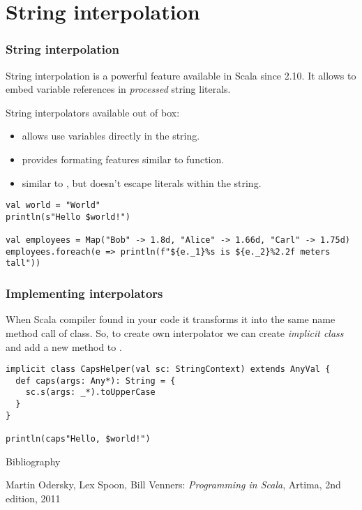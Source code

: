 \documentclass{beamer}
\begin{document}
\section{String interpolation}

\begin{frame}[fragile]
\frametitle{String interpolation}

String interpolation is a powerful feature available in Scala since 2.10.  It allows to embed variable
references in \emph{processed} string literals.

String interpolators available out of box:
\begin{itemize}
\item {} allows use variables directly in the string.
\item {} provides formating features similar to  function.
\item {} similar to , but doesn't escape literals within the string.
\end{itemize}

\begin{example}
\begin{lstlisting}
val world = "World"
println(s"Hello $world!")

val employees = Map("Bob" -> 1.8d, "Alice" -> 1.66d, "Carl" -> 1.75d)
employees.foreach(e => println(f"${e._1}%s is ${e._2}%2.2f meters tall"))
\end{lstlisting}
\end{example}
\end{frame}

\begin{frame}[fragile]
\frametitle{Implementing interpolators}

When Scala compiler found  in your code it transforms it into the same name method call
of  class.  So, to create own interpolator we can create \emph{implicit class} and add
a new method to .

\begin{lstlisting}
implicit class CapsHelper(val sc: StringContext) extends AnyVal {
  def caps(args: Any*): String = {
    sc.s(args: _*).toUpperCase
  }
}

println(caps"Hello, $world!")
\end{lstlisting}

\end{frame}

\begin{frame}{Bibliography}
\begin{thebibliography}{00}
Martin Odersky, Lex Spoon, Bill Venners:
\emph{Programming in Scala},
Artima, 2nd edition, 2011
\end{thebibliography}
\end{frame}


\end{document}
